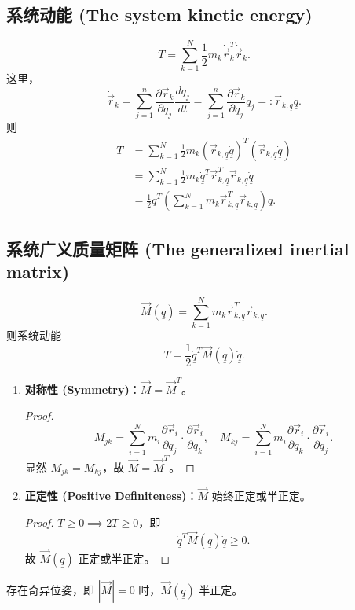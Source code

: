 \subsection{系统动能 (The system kinetic energy)}
\begin{definition}[系统动能]
\[
T = \sum_{k=1}^N \frac{1}{2} m_k \dot{\vec{r}}_k^T \dot{\vec{r}}_k.
\]
这里，
\[
\dot{\vec{r}}_k = \sum_{j=1}^n \frac{\partial \vec{r}_k}{\partial q_j} \frac{d q_j}{dt} = \sum_{j=1}^n \frac{\partial \vec{r}_k}{\partial q_j} \dot{q}_j =: \vec{r}_{k,\underline{q}} \dot{\underline{q}}.
\]
则
\[
\begin{aligned}
T &= \sum_{k=1}^N \frac{1}{2} m_k \left( \vec{r}_{k,\underline{q}} \dot{\underline{q}} \right)^T \left( \vec{r}_{k,\underline{q}} \dot{\underline{q}} \right) \\
&= \sum_{k=1}^N \frac{1}{2} m_k \dot{\underline{q}}^T \vec{r}_{k,\underline{q}}^T \vec{r}_{k,\underline{q}} \dot{\underline{q}} \\
&= \frac{1}{2} \dot{\underline{q}}^T \left( \sum_{k=1}^N m_k \vec{r}_{k,\underline{q}}^T \vec{r}_{k,\underline{q}} \right) \dot{\underline{q}}.
\end{aligned}
\]
\end{definition}

\subsection{系统广义质量矩阵 (The generalized inertial matrix)}
\begin{definition}[广义质量矩阵]
\[
\vec{M}(\underline{q}) = \sum_{k=1}^N m_k \vec{r}_{k,\underline{q}}^T \vec{r}_{k,\underline{q}}.
\]
则系统动能
\[
T = \frac{1}{2} \dot{\underline{q}}^T \vec{M}(\underline{q}) \dot{\underline{q}}.
\]
\end{definition}

\begin{proposition}[广义质量矩阵的性质]
\begin{enumerate}
\item \textbf{对称性 (Symmetry)}：\( \vec{M} = \vec{M}^T \)。
\begin{proof}
\[
M_{jk} = \sum_{i=1}^N m_i \frac{\partial \vec{r}_i}{\partial q_j} \cdot \frac{\partial \vec{r}_i}{\partial q_k}, \quad M_{kj} = \sum_{i=1}^N m_i \frac{\partial \vec{r}_i}{\partial q_k} \cdot \frac{\partial \vec{r}_i}{\partial q_j}.
\]
显然 \( M_{jk} = M_{kj} \)，故 \( \vec{M} = \vec{M}^T \)。
\end{proof}

\item \textbf{正定性 (Positive Definiteness)}：\( \vec{M} \) 始终正定或半正定。
\begin{proof}
\( T \geq 0 \implies 2T \geq 0 \)，即
\[
\dot{\underline{q}}^T \vec{M}(\underline{q}) \dot{\underline{q}} \geq 0.
\]
故 \( \vec{M}(\underline{q}) \) 正定或半正定。
\end{proof}
\end{enumerate}
\end{proposition}

\begin{remark}
存在奇异位姿，即 \( |\vec{M}| = 0 \) 时，\( \vec{M}(\underline{q}) \) 半正定。
\end{remark}